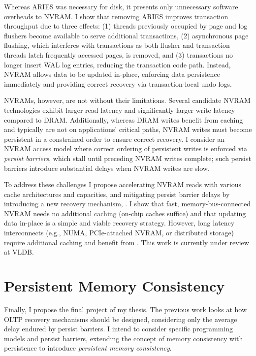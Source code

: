 Whereas ARIES was necessary for disk, it presents only unnecessary software overheads to NVRAM.
I show that removing ARIES improves transaction throughput due to three effects: (1) threads previously occupied by page and log flushers become available to serve additional transactions, (2) asynchronous page flushing, which interferes with transactions as both flusher and transaction threads latch frequently accessed pages, is removed, and (3) transactions no longer insert WAL log entries, reducing the transaction code path.
Instead, NVRAM allows data to be updated in-place, enforcing data persistence immediately and providing correct recovery via transaction-local undo logs.

NVRAMs, however, are not without their limitations.
Se\-veral candidate NVRAM technologies exhibit larger read latency and significantly larger write latency compared to DRAM.
Additionally, whereas DRAM writes benefit from caching and typically are not on applications' critical paths, NVRAM writes must become persistent in a constrained order to ensure correct recovery.
I consider an NVRAM access model where correct ordering of persistent writes is enforced via \emph{persist barriers}, which stall until preceding NVRAM writes complete; such persist barriers introduce substantial delays when NVRAM writes are slow.

To address these challenges I propose accelerating NVRAM reads with various cache architectures and capacities, and mitigating persist barrier delays by introducing a new recovery mechanism, \GroupCommit.
I show that fast, memory-bus-connected NVRAM needs no additional caching (on-chip caches suffice) and that updating data in-place is a simple and viable recovery strategy.
However, long latency interconnects (e.g., NUMA, PCIe-attached NVRAM, or distributed storage) require additional caching and benefit from \GroupCommit.
This work is currently under review at VLDB.

\section{Persistent Memory Consistency}
\label{sec:Intro:PMC}

Finally, I propose the final project of my thesis.
The previous work looks at how OLTP recovery mechanisms should be designed, considering only the average delay endured by persist barriers.
I intend to consider specific programming models and persist barriers, extending the concept of memory consistency with persistence to introduce \emph{persistent memory consistency}.

